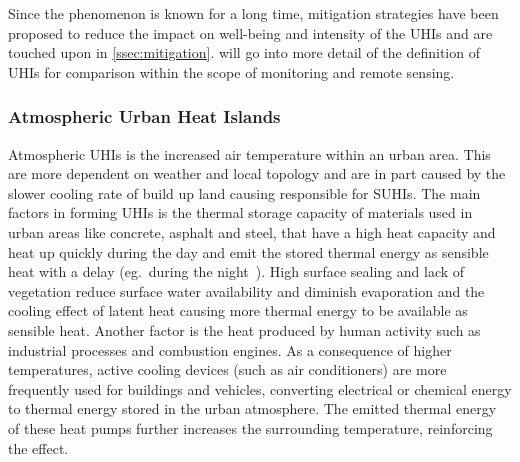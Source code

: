\documentclass[12pt,a4paper, english,twoside]{scrartcl}
\begin{document}
    
    Since the phenomenon is known for a long time, mitigation strategies have been proposed to reduce the impact on well-being and intensity of the \glspl{UHI} and are touched upon in \cref{ssec:mitigation}.
     will go into more detail of the definition of \glspl{UHI} for comparison within the scope of monitoring and remote sensing. 
%
    \subsubsection{Atmospheric Urban Heat Islands}\label{sec:at_uhi}
      Atmospheric \glspl{UHI} is the increased air temperature within an urban area. 
      This are more dependent on weather and local topology and are in part caused by the slower cooling rate of build up land causing responsible for \glspl{SUHI}.
      The main factors in forming \glspl{UHI} is the thermal storage capacity of materials used in urban areas like concrete, asphalt and steel, that have a high heat capacity and heat up quickly during the day and emit the stored thermal energy as sensible heat with a delay (eg.~during the night~\autocite{Ramamurthy2014}).
      High surface sealing and lack of vegetation reduce surface water availability and diminish evaporation and the cooling effect of latent heat causing more thermal energy to be available as sensible heat. 
      Another factor is the heat produced by human activity such as industrial processes and combustion engines.
      As a consequence of higher temperatures, active cooling devices (such as air conditioners) are more frequently used for buildings and vehicles, converting electrical or chemical energy to thermal energy stored in the urban atmosphere. 
      The emitted thermal energy of these heat pumps further increases the surrounding temperature, reinforcing the effect.
      \\
      
\end{document}
